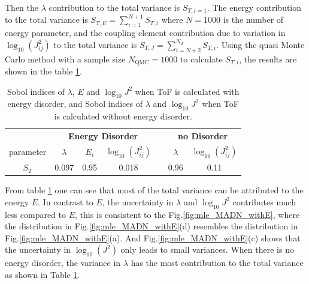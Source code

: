 \documentclass[letterpaper,12pt]{article}
\begin{document}
Then the $\lambda$ contribution to the total variance is $S_{T,i=1}$.
The energy contribution to the total variance is $S_{T,E} = \sum\limits_{i=1}^{N+1} S_{T,i}$ where $N=1000$ is the number of energy parameter, and the coupling element contribution due to variation in $\log_{10}(J_{ij}^2)$ to the total variance is $S_{T,J}=\sum\limits_{i=N+2}^{N_d} S_{T,i}$. 
Using the quasi Monte Carlo method\cite{sobol_global_2001} with a sample size $N_\text{QMC}=1000$ to calculate $S_{T,i}$, the results are shown in the table \ref{tab:Sobol}.
%
%

\begin{table}[H]
    \caption{Sobol indices of $\lambda$, $E$ and $\log_{10} J^2$ when ToF is calculated with energy disorder, and Sobol indices of $\lambda$ and $\log_{10} J^2$ when ToF is calculated without energy disorder.}\label{tab:Sobol}
    \begin{center}
      \begin{tabular}{c c c c c c c} \hline
        &  \multicolumn{3}{c}{\bf Energy Disorder} & &\multicolumn{2}{c}{\bf no Disorder}\\\cline{2-4}  \cline{6-7}
        parameter  & $\lambda$ & $ E_i$ & $ \log_{10}(J_{ij}^2)$ && $\lambda$ & $ \log_{10}(J_{ij}^2)$ \\ \hline
     $S_T$  & 0.097 & 0.95 & 0.018 && 0.96 & 0.11 \\
    \hline
      \end{tabular}
    \end{center}
\end{table}

From table \ref{tab:Sobol} one can see that most of the total variance can be attributed to the energy $E$. In contrast to $E$, the uncertainty in $\lambda$ and $\log_{10} J^2$ contributes much less compared to $E$, this is consistent to the Fig.\ref{fig:mle_MADN_withE}, where the distribution in Fig.\ref{fig:mle_MADN_withE}(d) resembles the distribution in Fig.\ref{fig:mle_MADN_withE}(a).
And Fig.\ref{fig:mle_MADN_withE}(c) shows that the uncertainty in $\log_{10}(J^2)$ only leads to small variances.
When there is no energy disorder, the variance in $\lambda$ has the most contribution to the total variance as shown in Table \ref{tab:Sobol}.
\end{document}
